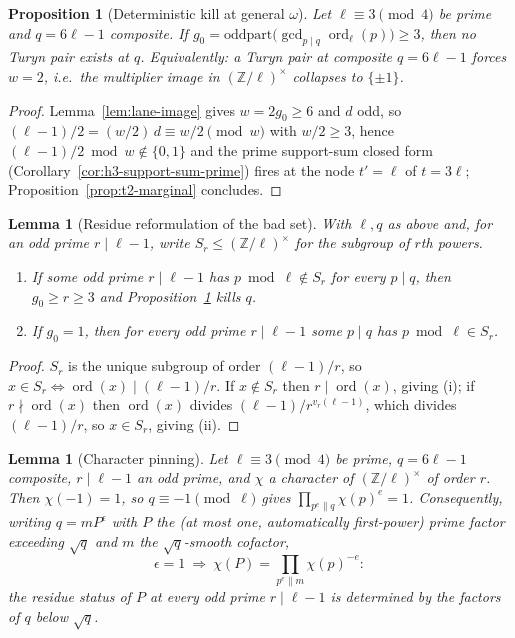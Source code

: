 \documentclass[11pt]{article}
\theoremstyle{plain}
\newtheorem{lemma}[theorem]{Lemma}
\newtheorem{proposition}[theorem]{Proposition}
\theoremstyle{definition}
\theoremstyle{remark}
\newcommand{\Z}{\mathbb Z}
\newcommand{\ord}{\operatorname{ord}}
\begin{document}
\begin{proposition}[Deterministic kill at general $\omega$]
\label{prop:lane-kill}
Let $\ell\equiv3\pmod4$ be prime and $q=6\ell-1$ composite.  If
$g_0=\mathrm{oddpart}\bigl(\gcd_{p\mid q}\ord_\ell(p)\bigr)\ge3$, then
no Turyn pair exists at $q$.  Equivalently: a Turyn pair at composite
$q=6\ell-1$ forces $w=2$, i.e.\ the multiplier image in
$(\Z/\ell)^\times$ collapses to $\{\pm1\}$.
\end{proposition}

\begin{proof}
Lemma~\ref{lem:lane-image} gives $w=2g_0\ge6$ and $d$ odd, so
$(\ell-1)/2=(w/2)\,d\equiv w/2\pmod w$ with $w/2\ge3$, hence
$(\ell-1)/2\bmod w\notin\{0,1\}$ and the prime support-sum closed form
(Corollary~\ref{cor:h3-support-sum-prime}) fires at the node
$t'=\ell$ of $t=3\ell$; Proposition~\ref{prop:t2-marginal} concludes.
\end{proof}

\begin{lemma}[Residue reformulation of the bad set]
\label{lem:lane-residue}
With $\ell,q$ as above and, for an odd prime $r\mid\ell-1$, write
$S_r\le(\Z/\ell)^\times$ for the subgroup of $r$th powers.
\begin{enumerate}
\item If some odd prime $r\mid\ell-1$ has $p\bmod\ell\notin S_r$ for
  every $p\mid q$, then $g_0\ge r\ge3$ and
  Proposition~\ref{prop:lane-kill} kills $q$.
\item If $g_0=1$, then for every odd prime $r\mid\ell-1$ some
  $p\mid q$ has $p\bmod\ell\in S_r$.
\end{enumerate}
\end{lemma}

\begin{proof}
$S_r$ is the unique subgroup of order $(\ell-1)/r$, so
$x\in S_r\iff\ord(x)\mid(\ell-1)/r$.  If $x\notin S_r$ then
$r\mid\ord(x)$, giving (i); if $r\nmid\ord(x)$ then
$\ord(x)$ divides $(\ell-1)/r^{v_r(\ell-1)}$, which divides
$(\ell-1)/r$, so $x\in S_r$, giving (ii).
\end{proof}

\begin{lemma}[Character pinning]\label{lem:character-pinning}
Let $\ell\equiv3\pmod4$ be prime, $q=6\ell-1$ composite,
$r\mid\ell-1$ an odd prime, and $\chi$ a character of
$(\Z/\ell)^\times$ of order $r$.  Then $\chi(-1)=1$, so
$q\equiv-1\pmod\ell$ gives $\prod_{p^e\parallel q}\chi(p)^{e}=1$.
Consequently, writing $q=mP^{\epsilon}$ with $P$ the (at most one,
automatically first-power) prime factor exceeding $\sqrt q$ and $m$ the
$\sqrt q$-smooth cofactor,
\[
  \epsilon=1\ \Longrightarrow\
  \chi(P)=\prod_{p^{e}\parallel m}\chi(p)^{-e}:
\]
the residue status of $P$ at every odd prime $r\mid\ell-1$ is
determined by the factors of $q$ below $\sqrt q$.
\end{lemma}
\end{document}
